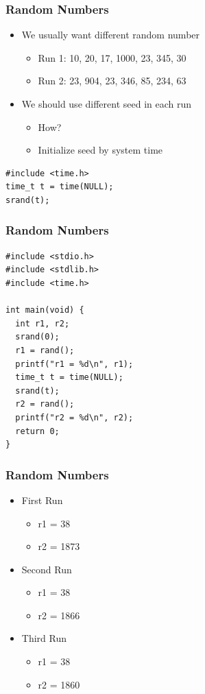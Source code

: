 \documentclass{../c-lecture}
\begin{document}
\begin{frame}[fragile]
  \frametitle{Random Numbers}
  \begin{itemize}
    \item We usually want different random number
    \begin{itemize}
      \item Run 1: 10, 20, 17, 1000, 23, 345, 30
      \item Run 2: 23, 904, 23, 346, 85, 234, 63
    \end{itemize}
    \item We should use different seed in each run
    \begin{itemize}
      \item How?
      \item Initialize seed by system time
    \end{itemize}
  \end{itemize}
  \begin{verbatim}
#include <time.h>
time_t t = time(NULL);
srand(t);
  \end{verbatim}
\end{frame}

\begin{frame}[fragile]
  \frametitle{Random Numbers}
  \scriptsize
  \begin{verbatim}
#include <stdio.h>
#include <stdlib.h>
#include <time.h>

int main(void) {
  int r1, r2;
  srand(0);
  r1 = rand();
  printf("r1 = %d\n", r1);
  time_t t = time(NULL);
  srand(t);
  r2 = rand();
  printf("r2 = %d\n", r2);
  return 0;
}
  \end{verbatim}
\end{frame}

\begin{frame}
  \frametitle{Random Numbers}
  \begin{itemize}
    \item First Run
    \begin{itemize}
      \item r1 = 38
      \item r2 = 1873
    \end{itemize}
    \item Second Run
    \begin{itemize}
      \item r1 = 38
      \item r2 = 1866
    \end{itemize}
    \item Third Run
    \begin{itemize}
      \item r1 = 38
      \item r2 = 1860
    \end{itemize}
  \end{itemize}
\end{frame}
\end{document}
